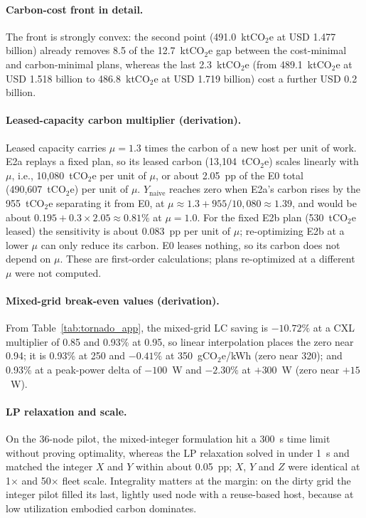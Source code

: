 \documentclass{article} %
\begin{document}
\paragraph{Carbon-cost front in detail.} The front is strongly convex: the second point (491.0~ktCO$_2$e at USD 1.477 billion) already removes 8.5 of the 12.7~ktCO$_2$e gap between the cost-minimal and carbon-minimal plans, whereas the last 2.3~ktCO$_2$e (from 489.1~ktCO$_2$e at USD 1.518 billion to 486.8~ktCO$_2$e at USD 1.719 billion) cost a further USD 0.2 billion.

\paragraph{Leased-capacity carbon multiplier (derivation).} Leased capacity carries $\mu = 1.3$ times the carbon of a new host per unit of work. E2a replays a fixed plan, so its leased carbon (13,104~tCO$_2$e) scales linearly with $\mu$, i.e., 10,080~tCO$_2$e per unit of $\mu$, or about 2.05~pp of the E0 total (490,607~tCO$_2$e) per unit of $\mu$. $Y_{\text{naive}}$ reaches zero when E2a's carbon rises by the 955~tCO$_2$e separating it from E0, at $\mu \approx 1.3 + 955/10{,}080 \approx 1.39$, and would be about $0.195 + 0.3 \times 2.05 \approx 0.81\%$ at $\mu = 1.0$. For the fixed E2b plan (530~tCO$_2$e leased) the sensitivity is about 0.083~pp per unit of $\mu$; re-optimizing E2b at a lower $\mu$ can only reduce its carbon. E0 leases nothing, so its carbon does not depend on $\mu$. These are first-order calculations; plans re-optimized at a different $\mu$ were not computed.

\paragraph{Mixed-grid break-even values (derivation).} From Table~\ref{tab:tornado_app}, the mixed-grid LC saving is $-10.72\%$ at a CXL multiplier of 0.85 and 0.93\% at 0.95, so linear interpolation places the zero near 0.94; it is 0.93\% at 250 and $-0.41\%$ at 350~gCO$_2$e/kWh (zero near 320); and 0.93\% at a peak-power delta of $-100$~W and $-2.30\%$ at $+300$~W (zero near $+15$~W).

\paragraph{LP relaxation and scale.} On the 36-node pilot, the mixed-integer formulation hit a 300~s time limit without proving optimality, whereas the LP relaxation solved in under 1~s and matched the integer $X$ and $Y$ within about 0.05~pp; $X$, $Y$ and $Z$ were identical at 1$\times$ and 50$\times$ fleet scale. Integrality matters at the margin: on the dirty grid the integer pilot filled its last, lightly used node with a reuse-based host, because at low utilization embodied carbon dominates.
\end{document}
